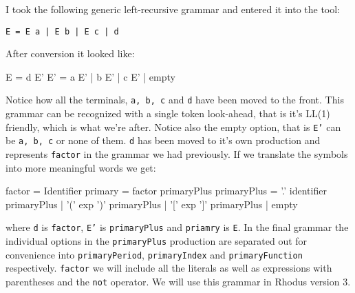 I took the following generic left-recursive grammar and entered it into the tool:

{\tt  E = E a | E b | E c | d}

After conversion it looked like:
%
\begin{lcverbatim}
E   = d E'
E'  = a E'
    | b E'
    | c E'
    | empty
\end{lcverbatim}
%
Notice how all the terminals, {\tt a, b, c} and {\tt d} have been moved to the front. This grammar can be recognized with a single token look-ahead, that is it's LL(1) friendly, which is what we're after. Notice also the empty option, that is {\tt E'} can be {\tt a, b, c} or none of them. {\tt d} has been moved to it's own production and represents {\tt factor} in the grammar we had previously. If we translate the symbols into more meaningful words we get:
%
\begin{lcverbatim}
factor               = Identifier
primary              =  factor primaryPlus
primaryPlus          = '.' identifier primaryPlus
                     | '(' exp ')' primaryPlus
                     | '[' exp ']' primaryPlus
                     | empty
\end{lcverbatim}
%
where {\tt d} is {\tt factor}, {\tt E'} is {\tt primaryPlus} and {\tt priamry} is {\tt E}.  In the final grammar the individual options in the {\tt primaryPlus} production are separated out for convenience into {\tt primaryPeriod}, {\tt primaryIndex} and {\tt primaryFunction} respectively. {\tt factor} we will include all the literals as well as expressions with parentheses and the {\tt not} operator. We will use this grammar in Rhodus version 3.


\begin{center}
\end{center} 